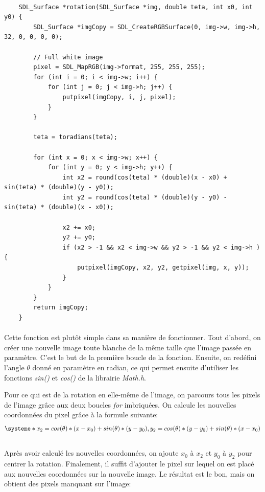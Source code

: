 \documentclass{article}
\begin{document}
\begin{lstlisting}

	SDL_Surface *rotation(SDL_Surface *img, double teta, int x0, int y0) {
        SDL_Surface *imgCopy = SDL_CreateRGBSurface(0, img->w, img->h, 32, 0, 0, 0, 0);
        
        // Full white image
        pixel = SDL_MapRGB(img->format, 255, 255, 255);
        for (int i = 0; i < img->w; i++) {
            for (int j = 0; j < img->h; j++) {
                putpixel(imgCopy, i, j, pixel);
            }
        }
        
        teta = toradians(teta);

        for (int x = 0; x < img->w; x++) {
            for (int y = 0; y < img->h; y++) {
                int x2 = round(cos(teta) * (double)(x - x0) + sin(teta) * (double)(y - y0));
                int y2 = round(cos(teta) * (double)(y - y0) - sin(teta) * (double)(x - x0));
                
                x2 += x0;
                y2 += y0;
                if (x2 > -1 && x2 < img->w && y2 > -1 && y2 < img->h ) {
                    putpixel(imgCopy, x2, y2, getpixel(img, x, y));
                }
            }
        }
        return imgCopy;
    }
\end{lstlisting}

\paragraph{}
Cette fonction est plutôt simple dans sa manière de fonctionner. Tout d'abord, on créer une nouvelle image toute blanche de la même taille que l'image passée en paramètre. C'est le but de la première boucle de la fonction. Ensuite, on redéfini l'angle $\theta$ donné en paramètre en radian, ce qui permet ensuite d'utiliser les fonctions \textit{sin()} et \textit{cos()} de la librairie \textit{Math.h}. 
\par Pour ce qui est de la rotation en elle-même de l'image, on parcours tous les pixels de l'image grâce aux deux boucles \textit{for} imbriquées. On calcule les nouvelles coordonnées du pixel grâce à la formule suivante: \\
\[
\systeme*{x_2 = cos(\theta)*(x - x_0) + sin(\theta)*(y - y_0), y_2 = cos(\theta)*(y - y_0) + sin(\theta)*(x - x_0)}
\] \\
Après avoir calculé les nouvelles coordonnées, on ajoute $x_0$ à $x_2$ et $y_0$ à $y_2$ pour centrer la rotation. Finalement, il suffit d'ajouter le pixel sur lequel on est placé aux nouvelles coordonnées sur la nouvelle image. Le résultat est le bon, mais on obtient des pixels manquant sur l'image: \\
\end{document}
